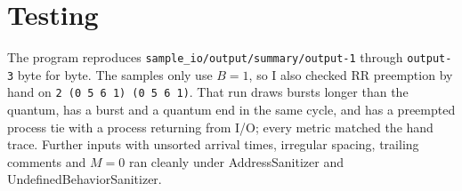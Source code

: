 \documentclass[11pt,letterpaper]{article}
\begin{document}
\section{Testing}

The program reproduces \texttt{sample\_io/output/summary/output-1} through \texttt{output-3} byte for byte. The
samples only use \(B = 1\), so I also checked RR preemption by hand on \texttt{2 (0 5 6 1) (0 5 6 1)}. That run
draws bursts longer than the quantum, has a burst and a quantum end in the same cycle, and has a preempted
process tie with a process returning from I/O; every metric matched the hand trace. Further inputs with
unsorted arrival times, irregular spacing, trailing comments and \(M = 0\) ran cleanly under AddressSanitizer
and UndefinedBehaviorSanitizer.
\end{document}
